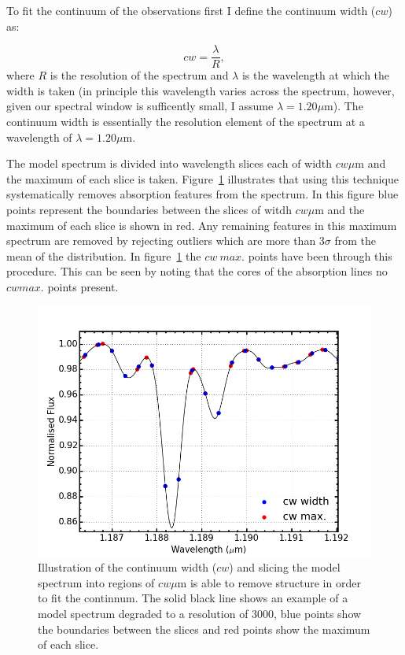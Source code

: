 \documentclass[12pt]{article}
\begin{document}
To fit the continuum of the observations first I define the continuum width ($cw$) as:

\begin{equation}
    cw = \frac{\lambda}{R}, %
\end{equation}
\noindent where $R$ is the resolution of the spectrum and
$\lambda$ is the wavelength at which the width is taken
(in principle this wavelength varies across the spectrum, however, given our spectral window is sufficently small, I assume $\lambda = 1.20\mu$m).
The continuum width is essentially the resolution element of the spectrum at a wavelength of $\lambda = 1.20\mu$m.

The model spectrum is divided into wavelength slices each of width $cw\mu$m and the maximum of each slice is taken.
Figure~\ref{fig:cw} illustrates that using this technique systematically removes absorption features from the spectrum.
In this figure blue points represent the boundaries between the slices of witdh $cw\mu$m and the maximum of each slice is shown in red.
Any remaining features in this maximum spectrum are removed by rejecting outliers which are more than 3$\sigma$ from the mean of the distribution.
In figure~\ref{fig:cw} the $cw~max.$ points have been through this procedure.
This can be seen by noting that the cores of the absorption lines no $cw max.$
points present.

\begin{figure}
 \centering
\includegraphics[width=\textwidth]{cw}
\caption{
Illustration of the continuum width ($cw$) and slicing the model spectrum into regions of $cw\mu$m is able to remove structure in order to fit the continnum.
The solid black line shows an example of a model spectrum degraded to a resolution of 3000,
blue points show the boundaries between the slices and red points show the maximum of each slice.\label{fig:cw}
         }
\end{figure}
\end{document}
